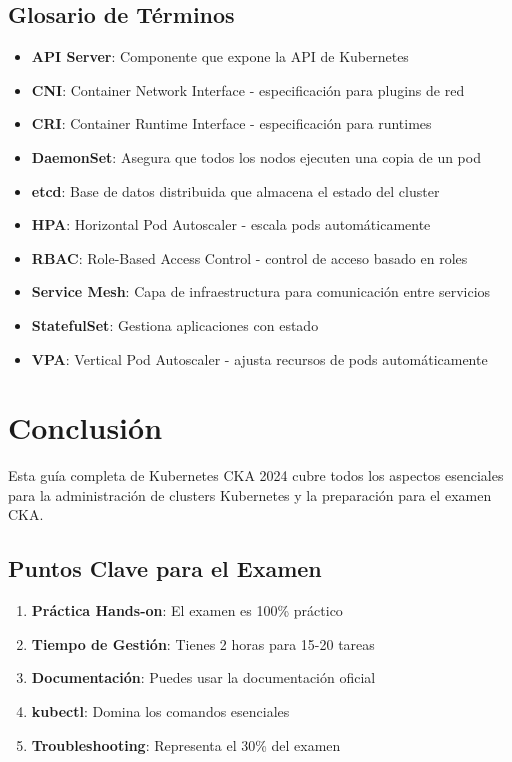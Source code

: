 \documentclass[11pt,a4paper]{article}
\begin{document}
\subsection{Glosario de Términos}

\begin{itemize}
    \item \textbf{API Server}: Componente que expone la API de Kubernetes
    \item \textbf{CNI}: Container Network Interface - especificación para plugins de red
    \item \textbf{CRI}: Container Runtime Interface - especificación para runtimes
    \item \textbf{DaemonSet}: Asegura que todos los nodos ejecuten una copia de un pod
    \item \textbf{etcd}: Base de datos distribuida que almacena el estado del cluster
    \item \textbf{HPA}: Horizontal Pod Autoscaler - escala pods automáticamente
    \item \textbf{RBAC}: Role-Based Access Control - control de acceso basado en roles
    \item \textbf{Service Mesh}: Capa de infraestructura para comunicación entre servicios
    \item \textbf{StatefulSet}: Gestiona aplicaciones con estado
    \item \textbf{VPA}: Vertical Pod Autoscaler - ajusta recursos de pods automáticamente
\end{itemize}

\newpage

\section{Conclusión}

\begin{infobox}
Esta guía completa de Kubernetes CKA 2024 cubre todos los aspectos esenciales para la administración de clusters Kubernetes y la preparación para el examen CKA.
\end{infobox}

\subsection{Puntos Clave para el Examen}

\begin{enumerate}
    \item \textbf{\textcolor{k8sblue}{Práctica Hands-on}}: El examen es 100\% práctico
    \item \textbf{\textcolor{k8ssuccess}{Tiempo de Gestión}}: Tienes 2 horas para 15-20 tareas
    \item \textbf{\textcolor{k8swarning}{Documentación}}: Puedes usar la documentación oficial
    \item \textbf{\textcolor{k8ssteelblue}{kubectl}}: Domina los comandos esenciales
    \item \textbf{\textcolor{k8serror}{Troubleshooting}}: Representa el 30\% del examen
\end{enumerate}
\end{document}

